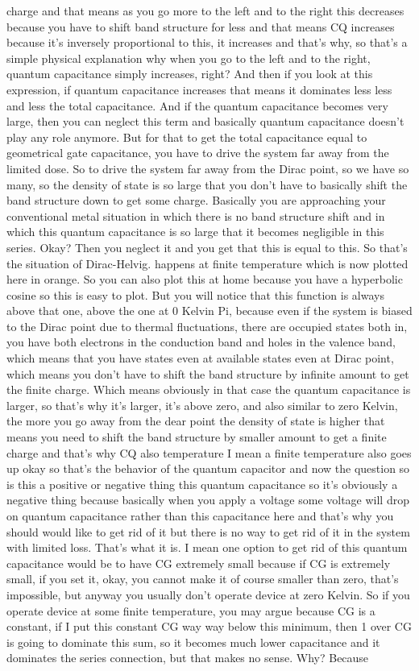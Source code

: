 charge and that means as you go more to the left and to the right this decreases because you have to shift band structure for less and that means CQ increases because it's inversely proportional to this, it increases and that's why, so that's a simple physical explanation why when you go to the left and to the right, quantum capacitance simply increases, right? And then if you look at this expression, if quantum capacitance increases that means it dominates less less and less the total capacitance. And if the quantum capacitance becomes very large, then you can neglect this term and basically quantum capacitance doesn't play any role anymore. But for that to get the total capacitance equal to geometrical gate capacitance, you have to drive the system far away from the limited dose. So to drive the system far away from the Dirac point, so we have so many, so the density of state is so large that you don't have to basically shift the band structure down to get some charge. Basically you are approaching your conventional metal situation in which there is no band structure shift and in which this quantum capacitance is so large that it becomes negligible in this series. Okay? Then you neglect it and you get that this is equal to this. So that's the situation of Dirac-Helvig. happens at finite temperature which is now plotted here in orange. So you can also plot this at home because you have a hyperbolic cosine so this is easy to plot. But you will notice that this function is always above that one, above the one at 0 Kelvin Pi, because even if the system is biased to the Dirac point due to thermal fluctuations, there are occupied states both in, you have both electrons in the conduction band and holes in the valence band, which means that you have states even at available states even at Dirac point, which means you don't have to shift the band structure by infinite amount to get the finite charge. Which means obviously in that case the quantum capacitance is larger, so that's why it's larger, it's above zero, and also similar to zero Kelvin, the more you go away from the dear point the density of state is higher that means you need to shift the band structure by smaller amount to get a finite charge and that's why CQ also temperature I mean a finite temperature also goes up okay so that's the behavior of the quantum capacitor and now the question so is this a positive or negative thing this quantum capacitance so it's obviously a negative thing because basically when you apply a voltage some voltage will drop on quantum capacitance rather than this capacitance here and that's why you should would like to get rid of it but there is no way to get rid of it in the system with limited loss. That's what it is. I mean one option to get rid of this quantum capacitance would be to have CG extremely small because if CG is extremely small, if you set it, okay, you cannot make it of course smaller than zero, that's impossible, but anyway you usually don't operate device at zero Kelvin. So if you operate device at some finite temperature, you may argue because CG is a constant, if I put this constant CG way way below this minimum, then 1 over CG is going to dominate this sum, so it becomes much lower capacitance and it dominates the series connection, but that makes no sense. Why? Because 